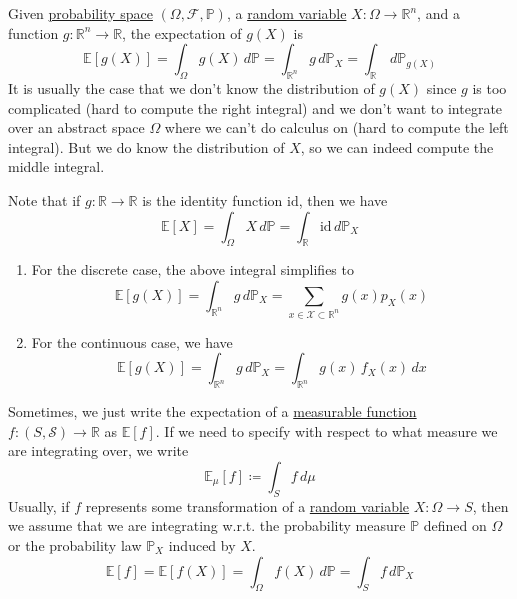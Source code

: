 	\begin{theorem}
	  \label{thm:lotus}
		Given \hyperref[def:probability-space]{probability space} $(\Omega, \mathcal{F}, \mathbb{P})$, a \hyperref[def:random-variable]{random variable} $X: \Omega \rightarrow \mathbb{R}^n$, and a function $g: \mathbb{R}^n \rightarrow \mathbb{R}$, the expectation of $g(X)$ is 
		\begin{equation}
			\mathbb{E}[g(X)] = \int_\Omega g(X) \,d\mathbb{P} = \int_{\mathbb{R}^n} g \, d\mathbb{P}_X = \int_\mathbb{R} \,d \mathbb{P}_{g(X)}
		\end{equation}
		It is usually the case that we don't know the distribution of $g(X)$ since $g$ is too complicated (hard to compute the right integral) and we don't want to integrate over an abstract space $\Omega$ where we can't do calculus on (hard to compute the left integral). But we do know the distribution of $X$, so we can indeed compute the middle integral. 
	\end{theorem}

	Note that if $g: \mathbb{R} \rightarrow \mathbb{R}$ is the identity function $\mathrm{id}$, then we have 
	\begin{equation}
		\mathbb{E}[X] = \int_\Omega X \,d\mathbb{P} = \int_{\mathbb{R}} \mathrm{id} \, d\mathbb{P}_X
	\end{equation}
	\begin{enumerate}
		\item For the discrete case, the above integral simplifies to 
		\begin{equation}
			\mathbb{E}[g(X)] = \int_{\mathbb{R}^n} g \,d \mathbb{P}_X = \sum_{x \in \mathcal{X} \subset \mathbb{R}^n} g(x) p_X (x)
		\end{equation}
		
		\item For the continuous case, we have 
		\begin{equation}
			\mathbb{E}[g(X)] = \int_{\mathbb{R}^n} g \,d \mathbb{P}_X = \int_{\mathbb{R}^n} g (x) \, f_X (x) \,dx
		\end{equation}
	\end{enumerate}


	Sometimes, we just write the expectation of a \hyperref[mt-def:measurable-function]{measurable function} $f: (S, \mathcal{S}) \rightarrow \mathbb{R}$ as $\mathbb{E}[f]$. If we need to specify with respect to what measure we are integrating over, we write 
	\begin{equation}
		\mathbb{E}_\mu [f] \coloneqq \int_S f \, d\mu
	\end{equation}
	Usually, if $f$ represents some transformation of a \hyperref[def:random-variable]{random variable} $X: \Omega \rightarrow S$, then we assume that we are integrating w.r.t. the probability measure $\mathbb{P}$ defined on $\Omega$ or the probability law $\mathbb{P}_X$ induced by $X$. 
	\begin{equation}
		\mathbb{E}[f] = \mathbb{E}[f(X)] = \int_\Omega f(X) \,d\mathbb{P} = \int_S f \,d\mathbb{P}_X
	\end{equation}

